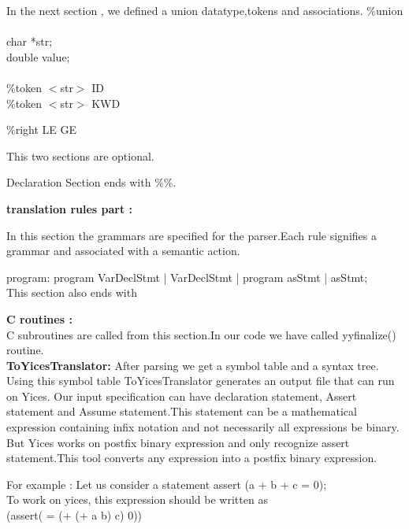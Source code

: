 \documentclass{svmult}
\begin{document}
   \noindent 
  In the next section , we defined a union datatype,tokens and associations.
  \%union\\
  {\\
    char *str;\\
    double value;\\
  }\\

  \noindent
  \%token $<$str$>$ ID\\
  \%token $<$str$>$ KWD

  \noindent
  \%right LE GE
 
 This two sections are optional.
 
 Declaration Section ends with \%\%.
 
 {\bf translation rules part :}
 
 In this section the grammars are specified for the parser.Each rule signifies 
 a grammar and associated with a semantic action.
 
 program: program VarDeclStmt | VarDeclStmt | program asStmt | asStmt;\\
    
 
This section also ends with %

{\bf C routines :}\\

C subroutines are called from this section.In our code we have called
yyfinalize() routine.\\
   
   

\noindent
{\bf ToYicesTranslator:} After parsing we get a symbol table and a syntax tree.
Using this symbol table ToYicesTranslator generates an output file that can run 
on Yices. Our input specification can have declaration statement, Assert statement 
and Assume statement.This statement can be a mathematical expression containing infix 
notation and not necessarily all expressions be binary. But Yices works on postfix 
binary expression and only recognize assert statement.This tool converts any expression
into a postfix binary expression.

For example : Let us consider a statement assert (a + b + c = 0);\\
              To work on yices, this expression should be written as\\
               
                 (assert( = (+ (+ a b) c) 0))\\
                 
\end{document}
